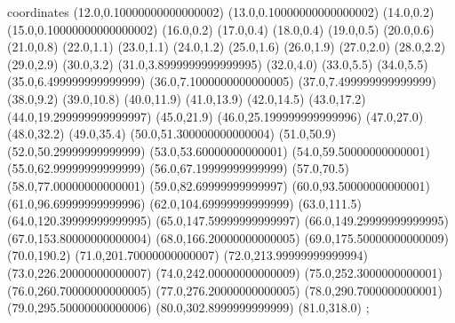 coordinates {%
(12.0,0.10000000000000002)
(13.0,0.10000000000000002)
(14.0,0.2)
(15.0,0.10000000000000002)
(16.0,0.2)
(17.0,0.4)
(18.0,0.4)
(19.0,0.5)
(20.0,0.6)
(21.0,0.8)
(22.0,1.1)
(23.0,1.1)
(24.0,1.2)
(25.0,1.6)
(26.0,1.9)
(27.0,2.0)
(28.0,2.2)
(29.0,2.9)
(30.0,3.2)
(31.0,3.8999999999999995)
(32.0,4.0)
(33.0,5.5)
(34.0,5.5)
(35.0,6.499999999999999)
(36.0,7.1000000000000005)
(37.0,7.499999999999999)
(38.0,9.2)
(39.0,10.8)
(40.0,11.9)
(41.0,13.9)
(42.0,14.5)
(43.0,17.2)
(44.0,19.299999999999997)
(45.0,21.9)
(46.0,25.199999999999996)
(47.0,27.0)
(48.0,32.2)
(49.0,35.4)
(50.0,51.300000000000004)
(51.0,50.9)
(52.0,50.29999999999999)
(53.0,53.60000000000001)
(54.0,59.50000000000001)
(55.0,62.99999999999999)
(56.0,67.19999999999999)
(57.0,70.5)
(58.0,77.00000000000001)
(59.0,82.69999999999997)
(60.0,93.50000000000001)
(61.0,96.69999999999996)
(62.0,104.69999999999999)
(63.0,111.5)
(64.0,120.39999999999995)
(65.0,147.59999999999997)
(66.0,149.29999999999995)
(67.0,153.80000000000004)
(68.0,166.20000000000005)
(69.0,175.50000000000009)
(70.0,190.2)
(71.0,201.70000000000007)
(72.0,213.99999999999994)
(73.0,226.20000000000007)
(74.0,242.00000000000009)
(75.0,252.3000000000001)
(76.0,260.70000000000005)
(77.0,276.20000000000005)
(78.0,290.7000000000001)
(79.0,295.50000000000006)
(80.0,302.8999999999999)
(81.0,318.0)
};
